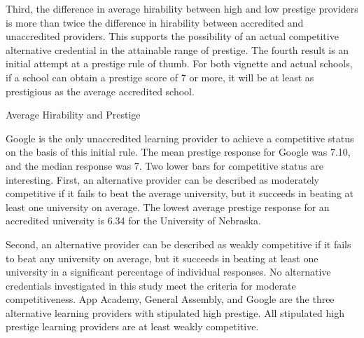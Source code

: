 Third, the difference in average hirability between high and low prestige providers
is more than twice the difference in hirability between accredited and unaccredited providers.
This supports the possibility of an actual competitive alternative credential in the attainable range of prestige.
The fourth result is an initial attempt at a prestige rule of thumb.
For both vignette and actual schools,
if a school can obtain a prestige score of 7 or more,
it will be at least as prestigious as the average accredited school.

\begin{table}
    \caption{Average Hirability and Prestige}
    \resizebox{\columnwidth}{!}{
        
    }
    \label{tab:desc_stats}
\end{table}


Google is the only unaccredited learning provider to achieve a competitive status on the basis of this initial rule.
The mean prestige response for Google was 7.10, and the median response was 7.
Two lower bars for competitive status are interesting.
First, an alternative provider can be described as moderately competitive if it fails to beat the average university,
but it succeeds in beating at least one university on average.
The lowest average prestige response for an accredited university is 6.34 for the University of Nebraska.

Second, an alternative provider can be described as weakly competitive if it fails to beat any university on average,
but it succeeds in beating at least one university in a significant percentage of individual responses.
No alternative credentials investigated in this study meet the criteria for moderate competitiveness.
App Academy, General Assembly, and Google are the three alternative learning providers with stipulated high prestige.
All stipulated high prestige learning providers are at least weakly competitive.

